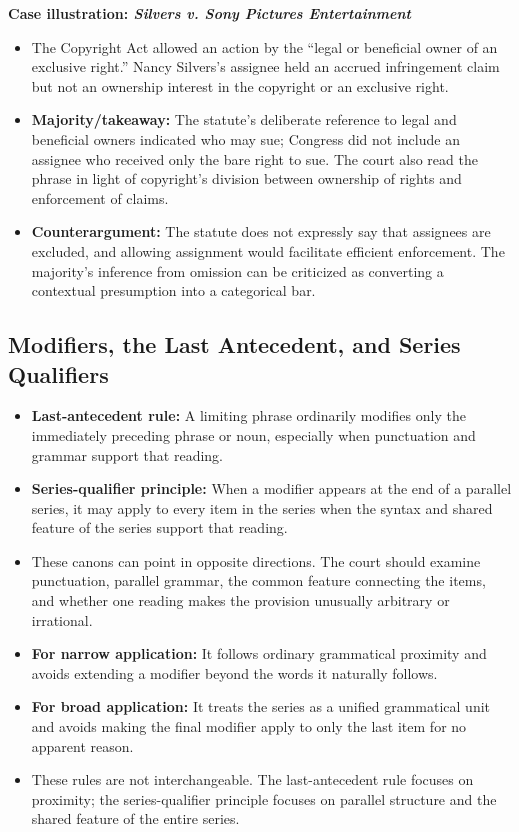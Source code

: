 \documentclass[11pt]{tex/lawoutline}
\begin{document}
\textbf{Case illustration: \textit{Silvers v. Sony Pictures Entertainment}}

\begin{itemize}
    \item The Copyright Act allowed an action by the ``legal or beneficial owner of an exclusive right.'' Nancy Silvers's assignee held an accrued infringement claim but not an ownership interest in the copyright or an exclusive right.
    \item \textbf{Majority/takeaway:} The statute's deliberate reference to legal and beneficial owners indicated who may sue; Congress did not include an assignee who received only the bare right to sue. The court also read the phrase in light of copyright's division between ownership of rights and enforcement of claims.
    \item \textbf{Counterargument:} The statute does not expressly say that assignees are excluded, and allowing assignment would facilitate efficient enforcement. The majority's inference from omission can be criticized as converting a contextual presumption into a categorical bar.
\end{itemize}

\subsection{Modifiers, the Last Antecedent, and Series Qualifiers}

\begin{itemize}
    \item \textbf{Last-antecedent rule:} A limiting phrase ordinarily modifies only the immediately preceding phrase or noun, especially when punctuation and grammar support that reading.
    \item \textbf{Series-qualifier principle:} When a modifier appears at the end of a parallel series, it may apply to every item in the series when the syntax and shared feature of the series support that reading.
    \item These canons can point in opposite directions. The court should examine punctuation, parallel grammar, the common feature connecting the items, and whether one reading makes the provision unusually arbitrary or irrational.
    \item \textbf{For narrow application:} It follows ordinary grammatical proximity and avoids extending a modifier beyond the words it naturally follows.
    \item \textbf{For broad application:} It treats the series as a unified grammatical unit and avoids making the final modifier apply to only the last item for no apparent reason.
    \item These rules are not interchangeable. The last-antecedent rule focuses on proximity; the series-qualifier principle focuses on parallel structure and the shared feature of the entire series.
\end{itemize}
\end{document}
